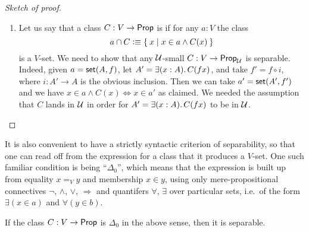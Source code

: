 \begin{proof}[Sketch of proof]
\begin{enumerate}
\item Let us say that a class $C: V\to\mathsf{Prop}$ is  if for any $a:V$ the class
  \begin{equation*}
    a \cap C \vcentcolon\equiv\Set{x | x\in a \wedge C(x)}
  \end{equation*}
  is a $V$-set.
We need to show that any $\mathcal{U}$-small  $C: V \to \mathsf{Prop}_\mathcal{U}$ is separable. Indeed, given $a=\mathsf{set}(A,f)$, let $A' = \exis{x:A}C(fx)$, and take $f' = f\circ i$, where $i : A' \to A$ is the obvious inclusion.  Then we can take $a' = \mathsf{set}(A',f')$ and we have $x\in a\wedge C(x) \Leftrightarrow x\in a'$ as claimed.  We needed the assumption that $C$ lands in $\mathcal{U}$ in order for $A' = \exis{x:A}C(fx)$ to be in $\mathcal{U}$.\qedhere
\end{enumerate}
\end{proof}

It is also convenient to have a strictly syntactic criterion of separability, so that one can read off from the expression for a class that it produces a $V$-set.  One such familiar condition is being ``$\Delta_0$'', which means that the expression is built up from equality $x=_V y$ and membership $x\in y$, using only mere-propositional connectives $\neg$, $\land$, $\lor$, $\Rightarrow$ and quantifers $\forall$, $\exists$ over particular sets, i.e.\ of the form $\exists(x\in a)$ and $\forall(y\in b)$.  

\begin{cor}\label{cor:Delta0sep}
If the class $C: V \to \mathsf{Prop}$ is $\Delta_0$ in the above sense, then it is separable.
\end{cor}


